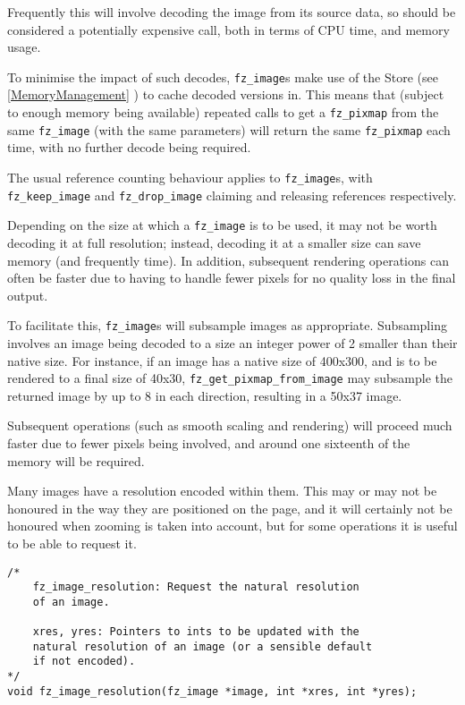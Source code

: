 \documentclass[oneside]{book}
\newcommand{\rjwref}[1] {\autoref{#1} \nameref{#1}}
\begin{document}
Frequently this will involve decoding the image from its source data, so should be considered a potentially expensive call, both in terms of CPU time, and memory usage.

To minimise the impact of such decodes, \texttt{fz\_image}s make use of the Store (see \rjwref{MemoryManagement}) to cache decoded versions in.  This means that (subject to enough memory being available) repeated calls to get a \texttt{fz\_pixmap} from the same \texttt{fz\_image} (with the same parameters) will return the same \texttt{fz\_pixmap} each time, with no further decode being required.

The usual reference counting behaviour applies to \texttt{fz\_image}s, with \texttt{fz\_keep\_image} and \texttt{fz\_drop\_image} claiming and releasing references respectively.

Depending on the size at which a \texttt{fz\_image} is to be used, it may not be worth decoding it at full resolution; instead, decoding it at a smaller size can save memory (and frequently time). In addition, subsequent rendering operations can often be faster due to having to handle fewer pixels for no quality loss in the final output.

To facilitate this, \texttt{fz\_image}s will subsample images as appropriate. Subsampling involves an image being decoded to a size an integer power of 2 smaller than their native size. For instance, if an image has a native size of 400x300, and is to be rendered to a final size of 40x30, \texttt{fz\_get\_pixmap\_from\_image} may subsample the returned image by up to 8 in each direction, resulting in a 50x37 image.

Subsequent operations (such as smooth scaling and rendering) will proceed much faster due to fewer pixels being involved, and around one sixteenth of the memory will be required.

Many images have a resolution encoded within them. This may or may not be honoured in the way they are positioned on the page, and it will certainly not be honoured when zooming is taken into account, but for some operations it is useful to be able to request it.

\begin{lstlisting}
/*
	fz_image_resolution: Request the natural resolution
	of an image.

	xres, yres: Pointers to ints to be updated with the
	natural resolution of an image (or a sensible default
	if not encoded).
*/
void fz_image_resolution(fz_image *image, int *xres, int *yres);
\end{lstlisting}
\end{document}
